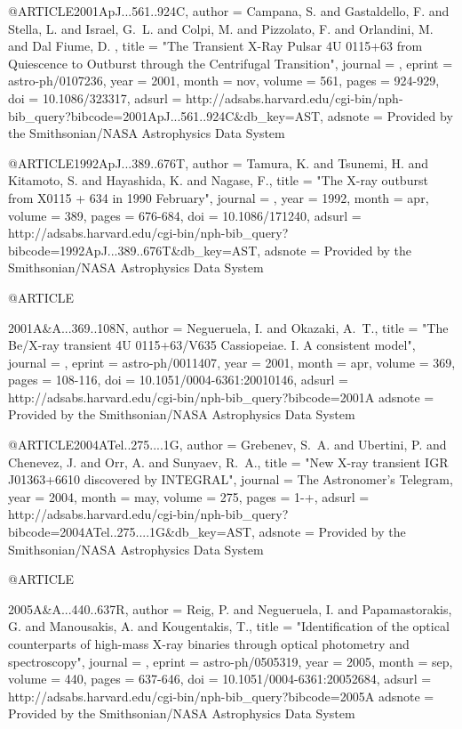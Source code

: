 {{{{{{{{{{{{@ARTICLE{2001ApJ...561..924C,
   author = {{Campana}, S. and {Gastaldello}, F. and {Stella}, L. and {Israel}, G.~L. and 
	{Colpi}, M. and {Pizzolato}, F. and {Orlandini}, M. and {Dal Fiume}, D.
	},
    title = "{The Transient X-Ray Pulsar 4U 0115+63 from Quiescence to Outburst through the Centrifugal Transition}",
  journal = {\apj},
   eprint = {astro-ph/0107236},
     year = 2001,
    month = nov,
   volume = 561,
    pages = {924-929},
      doi = {10.1086/323317},
   adsurl = {http://adsabs.harvard.edu/cgi-bin/nph-bib_query?bibcode=2001ApJ...561..924C&db_key=AST},
  adsnote = {Provided by the Smithsonian/NASA Astrophysics Data System}
}



@ARTICLE{1992ApJ...389..676T,
   author = {{Tamura}, K. and {Tsunemi}, H. and {Kitamoto}, S. and {Hayashida}, K. and 
	{Nagase}, F.},
    title = "{The X-ray outburst from X0115 + 634 in 1990 February}",
  journal = {\apj},
     year = 1992,
    month = apr,
   volume = 389,
    pages = {676-684},
      doi = {10.1086/171240},
   adsurl = {http://adsabs.harvard.edu/cgi-bin/nph-bib_query?bibcode=1992ApJ...389..676T&db_key=AST},
  adsnote = {Provided by the Smithsonian/NASA Astrophysics Data System}
}



@ARTICLE{2001A&A...369..108N,
   author = {{Negueruela}, I. and {Okazaki}, A.~T.},
    title = "{The Be/X-ray transient 4U 0115+63/V635 Cassiopeiae. I. A consistent model}",
  journal = {\aap},
   eprint = {astro-ph/0011407},
     year = 2001,
    month = apr,
   volume = 369,
    pages = {108-116},
      doi = {10.1051/0004-6361:20010146},
   adsurl = {http://adsabs.harvard.edu/cgi-bin/nph-bib_query?bibcode=2001A%
  adsnote = {Provided by the Smithsonian/NASA Astrophysics Data System}
}



@ARTICLE{2004ATel..275....1G,
   author = {{Grebenev}, S.~A. and {Ubertini}, P. and {Chenevez}, J. and 
	{Orr}, A. and {Sunyaev}, R.~A.},
    title = "{New X-ray transient IGR J01363+6610 discovered by INTEGRAL}",
  journal = {The Astronomer's Telegram},
     year = 2004,
    month = may,
   volume = 275,
    pages = {1-+},
   adsurl = {http://adsabs.harvard.edu/cgi-bin/nph-bib_query?bibcode=2004ATel..275....1G&db_key=AST},
  adsnote = {Provided by the Smithsonian/NASA Astrophysics Data System}
}



@ARTICLE{2005A&A...440..637R,
   author = {{Reig}, P. and {Negueruela}, I. and {Papamastorakis}, G. and 
	{Manousakis}, A. and {Kougentakis}, T.},
    title = "{Identification of the optical counterparts of high-mass X-ray binaries through optical photometry and spectroscopy}",
  journal = {\aap},
   eprint = {astro-ph/0505319},
     year = 2005,
    month = sep,
   volume = 440,
    pages = {637-646},
      doi = {10.1051/0004-6361:20052684},
   adsurl = {http://adsabs.harvard.edu/cgi-bin/nph-bib_query?bibcode=2005A%
  adsnote = {Provided by the Smithsonian/NASA Astrophysics Data System}
}



}}}}}}}}}}}}}}
